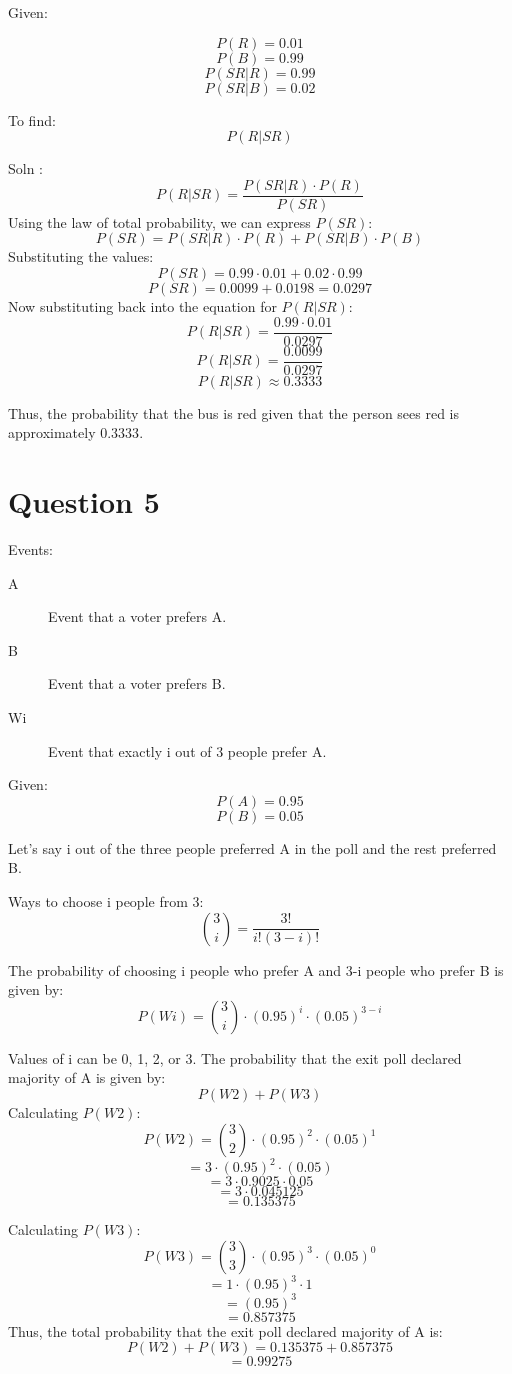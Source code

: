 \documentclass{report}
\begin{document}
Given: 

\[P(R) = 0.01\] 
\[P(B) = 0.99\] 
\[P(SR | R) = 0.99\]
\[P (SR | B) = 0.02\]

To find: 
\[P ( R | SR )\]

Soln :
\[P ( R | SR) = \frac{P ( SR | R ) \cdot P ( R )}{P ( SR )}\]
Using the law of total probability, we can express \( P(SR) \):
\[P(SR) = P(SR | R) \cdot P(R) + P(SR | B) \cdot P(B)\]
Substituting the values:
\[P(SR) = 0.99 \cdot 0.01 + 0.02 \cdot 0.99\]
\[P(SR) = 0.0099 + 0.0198 = 0.0297\]
Now substituting back into the equation for \( P(R | SR) \):
\[P(R | SR) = \frac{0.99 \cdot 0.01}{0.0297}\]
\[P(R | SR) = \frac{0.0099}{0.0297}\]
\[P(R | SR) \approx 0.3333\]        

Thus, the probability that the bus is red given that the person sees red is approximately \( 0.3333 \).

\section*{Question 5}
Events:
\begin{description}
    \item[A] Event that a voter prefers A.
    \item[B] Event that a voter prefers B.
    \item[Wi] Event that exactly i out of 3 people prefer A.
\end{description}

Given:
\[P(A) = 0.95\]
\[P(B) = 0.05\]

Let's say i out of the three people preferred A in the poll and the rest preferred B.

Ways to choose i people from 3:
\begin{equation}
\binom{3}{i} = \frac{3!}{i!(3-i)!}
\label{eq:binomial}
\end{equation}

The probability of choosing i people who prefer A and 3-i people who prefer B is given by:
\[ P(Wi) = \binom{3}{i} \cdot (0.95)^i \cdot (0.05)^{3-i}\]  

Values of i can be 0, 1, 2, or 3.
The probability that the exit poll declared majority of A is given by:
\[P(W2) + P(W3)\]
Calculating \( P(W2) \):
\[P(W2) = \binom{3}{2} \cdot (0.95)^2 \cdot (0.05)^1\]
\[= 3 \cdot (0.95)^2 \cdot (0.05)\]
\[= 3 \cdot 0.9025 \cdot 0.05\]
\[= 3 \cdot 0.045125\]
\[= 0.135375\]      

Calculating \( P(W3) \):
\[P(W3) = \binom{3}{3} \cdot (0.95)^3 \cdot (0.05)^0\]
\[= 1 \cdot (0.95)^3 \cdot 1\]
\[= (0. 95)^3\]
\[= 0.857375\]
Thus, the total probability that the exit poll declared majority of A is:
\[P(W2) + P(W3) = 0.135375 + 0.857375\]
\[= 0.99275\]
\end{document}
